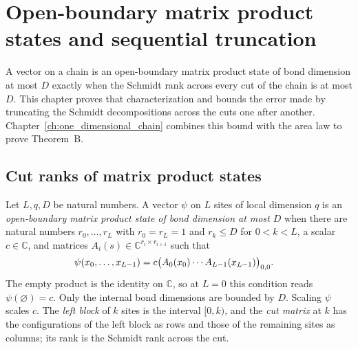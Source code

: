 \chapter{Open-boundary matrix product states and sequential truncation}
\label{ch:one_dimensional_open_mps}

A vector on a chain is an open-boundary matrix product state of bond
dimension at most $D$ exactly when the Schmidt rank across every cut of
the chain is at most $D$. This chapter proves that characterization and
bounds the error made by truncating the Schmidt decompositions across
the cuts one after another. Chapter~\ref{ch:one_dimensional_chain} combines
this bound with the area law to prove Theorem~B.

\section{Cut ranks of matrix product states}

\begin{definition}
    \label{def:chain_open_mps}
    \leanok
    Let $L,q,D$ be natural numbers. A vector $\psi$ on $L$ sites of local
    dimension $q$ is an \emph{open-boundary matrix product state of bond
        dimension at most $D$} when there are natural numbers $r_0,\ldots,r_L$
    with $r_0=r_L=1$ and $r_k\leq D$ for $0<k<L$, a scalar $c\in\mathbb C$,
    and matrices $A_i(s)\in\mathbb C^{r_i\times r_{i+1}}$ such that
    \begin{align}
        \psi(x_0,\ldots,x_{L-1})
         & =c\bigl(A_0(x_0)\cdots A_{L-1}(x_{L-1})\bigr)_{0,0}. \notag
    \end{align}
    The empty product is the identity on $\mathbb C$, so at $L=0$ this
    condition reads $\psi(\varnothing)=c$. Only the internal bond dimensions
    are bounded by $D$. Scaling $\psi$ scales $c$.
    The \emph{left block} of $k$ sites is the interval $[0,k)$, and the
    \emph{cut matrix} at $k$ has the configurations of the left block as rows
    and those of the remaining sites as columns; its rank is the Schmidt
    rank across the cut.
    
\end{definition}

